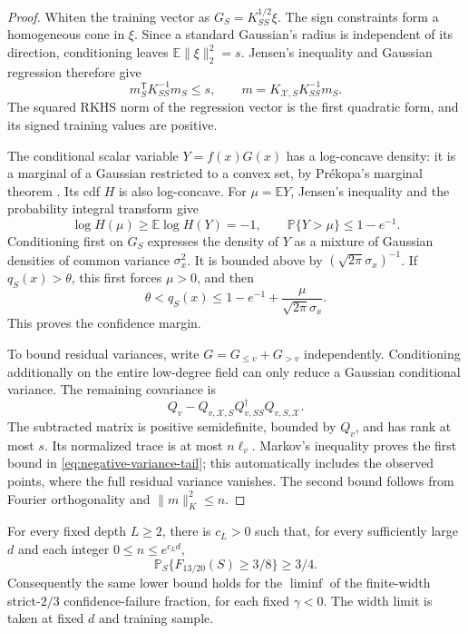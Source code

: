 \begin{proof}
Whiten the training vector as $G_S=K_{SS}^{1/2}\xi$.
The sign constraints form a homogeneous cone in $\xi$. Since a standard
Gaussian's radius is independent of its direction, conditioning leaves
$\mathbb E\|\xi\|_2^2=s$. Jensen's inequality and Gaussian regression
therefore give
\[
 m_S^{\mathsf T}K_{SS}^{-1}m_S\le s,
 \qquad m=K_{\mathcal X,S}K_{SS}^{-1}m_S.
\]
The squared RKHS norm of the regression vector is the first quadratic
form, and its signed training values are positive.

The conditional scalar variable $Y=f(x)G(x)$ has a log-concave density:
it is a marginal of a Gaussian restricted to a convex set, by
Pr\'ekopa's marginal theorem \cite{prekopa1973}. Its cdf $H$ is also
log-concave. For $\mu=\mathbb E Y$, Jensen's inequality and the probability
integral transform give
\[
 \log H(\mu)\ge\mathbb E\log H(Y)=-1,
 \qquad \mathbb P\{Y>\mu\}\le1-e^{-1}.
\]
Conditioning first on $G_S$ expresses the density of $Y$ as a mixture
of Gaussian densities of common variance $\sigma_x^2$. It is bounded
above by $(\sqrt{2\pi}\sigma_x)^{-1}$. If $q_S(x)>\theta$, this first
forces $\mu>0$, and then
\[
 \theta<q_S(x)\le1-e^{-1}
                  +\frac{\mu}{\sqrt{2\pi}\sigma_x}.
\]
This proves the confidence margin.

To bound residual variances, write $G=G_{\le v}+G_{>v}$ independently.
Conditioning additionally on the entire low-degree field can only
reduce a Gaussian conditional variance. The remaining covariance is
\[
 Q_v-Q_{v,\mathcal X,S}Q_{v,SS}^{\dagger}Q_{v,S,\mathcal X}.
\]
The subtracted matrix is positive semidefinite, bounded by $Q_v$, and
has rank at most $s$. Its normalized trace is at most $n\ell_v$.
Markov's inequality proves the first bound in
\eqref{eq:negative-variance-tail}; this automatically includes the
observed points, where the full residual variance vanishes.
The second bound follows from Fourier orthogonality and
$\|m\|_K^2\le n$.
\end{proof}

\begin{theorem}
\label{thm:negative-all-n}
For every fixed depth $L\ge2$, there is $c_L>0$ such that, for every
sufficiently large $d$ and each integer $0\le n\le e^{c_Ld}$,
\[
 \mathbb P_S\{F_{13/20}(S)\ge3/8\}\ge3/4.
\]
Consequently the same lower bound holds for the $\liminf$ of the
finite-width strict-$2/3$ confidence-failure fraction, for each fixed
$\gamma<0$. The width limit is taken at fixed $d$ and training sample.
\end{theorem}

